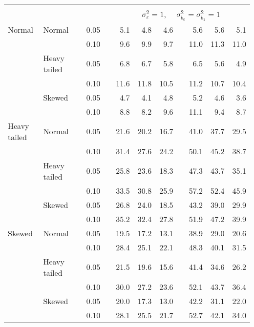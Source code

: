 \begin{table}[ht]
\begin{scriptsize}
\begin{center}
\begin{tabular}{ll p{.1cm} c p{.1cm} rrr p{.1cm} rrr}
&&&&&&&&&&&\\
& && && \multicolumn{7}{c}{$\sigma_{\varepsilon}^2 = 1$, \ \ $\sigma_{b_0}^2 = \sigma_{b_1}^2 = 1$} \\ \cline{6-12}
Normal       & Normal       && 0.05 &&   5.1 & 4.8 & 4.6 &   & 5.6 & 5.6 & 5.1 \\ 
             &              && 0.10 &&   9.6 & 9.9 & 9.7 &   & 11.0 & 11.3 & 11.0 \\ 
             & Heavy tailed && 0.05 &&   6.8 & 6.7 & 5.8 &   & 6.5 & 5.6 & 4.9 \\ 
             &              && 0.10 &&   11.6 & 11.8 & 10.5 &   & 11.2 & 10.7 & 10.4 \\ 
             & Skewed       && 0.05 &&   4.7 & 4.1 & 4.8 &   & 5.2 & 4.6 & 3.6 \\ 
             &              && 0.10 &&   8.8 & 8.2 & 9.6 &   & 11.1 & 9.4 & 8.7 \\ 
Heavy tailed & Normal       && 0.05 &&   21.6 & 20.2 & 16.7 &   & 41.0 & 37.7 & 29.5 \\ 
             &              && 0.10 &&   31.4 & 27.6 & 24.2 &   & 50.1 & 45.2 & 38.7 \\ 
             & Heavy tailed && 0.05 &&   25.8 & 23.6 & 18.3 &   & 47.3 & 43.7 & 35.1 \\ 
             &              && 0.10 &&   33.5 & 30.8 & 25.9 &   & 57.2 & 52.4 & 45.9 \\ 
             & Skewed       && 0.05 &&   26.8 & 24.0 & 18.5 &   & 43.2 & 39.0 & 29.9 \\ 
             &              && 0.10 &&   35.2 & 32.4 & 27.8 &   & 51.9 & 47.2 & 39.9 \\ 
Skewed       & Normal       && 0.05 &&   19.5 & 17.2 & 13.1 &   & 38.9 & 29.0 & 20.6 \\ 
             &              && 0.10 &&   28.4 & 25.1 & 22.1 &   & 48.3 & 40.1 & 31.5 \\ 
             & Heavy tailed && 0.05 &&   21.5 & 19.6 & 15.6 &   & 41.4 & 34.6 & 26.2 \\ 
             &              && 0.10 &&   30.0 & 27.2 & 23.6 &   & 52.1 & 43.7 & 36.4 \\ 
             & Skewed       && 0.05 &&   20.0 & 17.3 & 13.0 &   & 42.2 & 31.1 & 22.0 \\ 
             &              && 0.10 &&   28.1 & 25.5 & 21.7 &   & 52.7 & 42.1 & 34.0 \\ 


\end{tabular}
\end{center}
\end{scriptsize}
\end{table}

